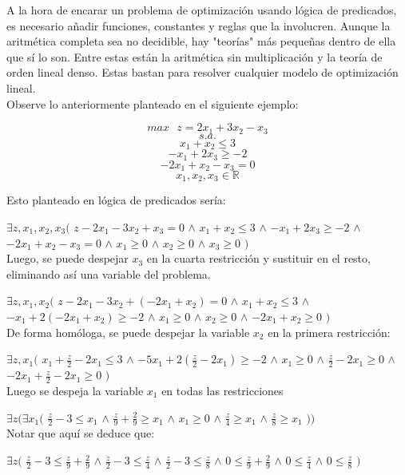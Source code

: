 \documentclass[12pt]{report}
\begin{document}
A la hora de encarar un problema de optimización usando lógica de predicados, es necesario añadir funciones, constantes y reglas que la involucren. Aunque la aritmética completa sea no decidible, hay "teorías" más pequeñas dentro de ella que sí lo son. Entre estas están la aritmética sin multiplicación y la teoría de orden lineal denso. Estas bastan para resolver cualquier modelo de optimización lineal.\\

Observe lo anteriormente planteado en el siguiente ejemplo:

$$max \text{ }z= 2x_1 + 3x_2 - x_3 $$
$$s.a.$$
$$ x_1 + x_2 \leq  3 $$
$$ -x_1 + 2x_3 \geq  -2 $$
$$ -2x_1 + x_2 - x_3 = 0 $$
$$ x_1, x_2, x_3 \in \mathbb{R}  $$

Esto planteado en lógica de predicados sería:

$\exists z,x_1,x_2,x_3 ($
$z - 2x_1 - 3x_2 + x_3 = 0$ $\land$
$ x_1 + x_2 \leq  3 $ $\land$
$ -x_1 + 2x_3 \geq  -2 $ $\land$
$ -2x_1 + x_2 - x_3 = 0 $ $\land$
$ x_1\geq  0 $ $\land$ 
$ x_2\geq  0 $ $\land$ 
$ x_3\geq  0 $ 
$)$\\

Luego, se puede despejar $x_3$ en la cuarta restricción y sustituir en el resto, eliminando así una variable del problema.

$\exists z,x_1,x_2($
$z - 2x_1 - 3x_2 + (-2x_1 + x_2) = 0$ $\land$
$ x_1 + x_2 \leq  3 $ $\land$
$ -x_1 + 2(-2x_1 + x_2) \geq  -2 $ $\land$
$ x_1\geq  0 $ $\land$ 
$ x_2\geq  0 $ $\land$ 
$ -2x_1 + x_2\geq  0 $ 
$)$\\

De forma homóloga, se puede despejar la variable $x_2$ en la primera restricción:

$\exists z,x_1 ($
$ x_1 + \frac z 2 -2x_1 \leq  3 $ $\land$
$ -5x_1 + 2(\frac z 2 -2x_1) \geq  -2 $ $\land$
$ x_1\geq  0 $ $\land$ 
$ \frac z 2 -2x_1 \geq  0 $ $\land$ 
$ -2x_1 + \frac z 2 -2x_1 \geq  0 $
$)$\\

Luego se despeja la variable $x_1$ en todas las restricciones

$\exists z (\exists x_1 ($
$ \frac z 2 - 3 \leq   x_1 $ $\land$
$ \frac z 9 + \frac 2 9 \geq  x_1 $ $\land$
$ x_1\geq  0 $ $\land$ 
$ \frac z 4 \geq  x_1 $ $\land$ 
$ \frac z 8 \geq  x_1 $ $))$\\

Notar que aquí se deduce que:

$\exists z ($
$ \frac z 2 - 3 \leq   \frac z 9 + \frac 2 9 $ $\land$
$ \frac z 2 - 3 \leq  \frac z 4  $ $\land$
$ \frac z 2 - 3 \leq  \frac z 8 $ $\land$
$ 0 \leq   \frac z 9 + \frac 2 9 $ $\land$
$ 0 \leq  \frac z 4  $ $\land$
$ 0 \leq  \frac z 8 $ 
$)$\\
\end{document}

